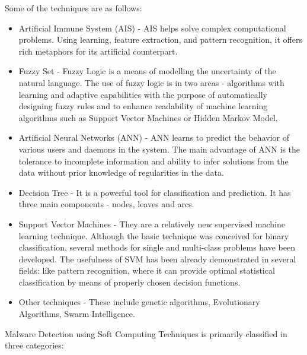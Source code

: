 \documentclass[11pt]{article}
\begin{document}
	Some of the techniques are as follows:
	\begin{itemize}
		\item Artificial Immune System (AIS) - AIS helps solve complex computational problems. Using learning, feature extraction, and pattern recognition, it offers rich metaphors for its artificial counterpart.
		\item Fuzzy Set - Fuzzy Logic is a means of modelling the uncertainty of the natural language. The use of fuzzy logic is in two areas - algorithms with learning and adaptive capabilities with the purpose of automatically designing fuzzy rules and to enhance readability of machine learning algorithms such as Support Vector Machines or Hidden Markov Model.
		\item Artificial Neural Networks (ANN) - ANN learns to predict the behavior of various users and daemons in the system. The main advantage of ANN is the tolerance to incomplete information and ability to infer solutions from the data without prior knowledge of regularities in the data.
		\item Decision Tree - It is a powerful tool for classification and prediction. It has three main components - nodes, leaves and arcs.
		\item Support Vector Machines - They are a relatively new supervised machine learning technique. Although the basic technique was conceived for binary classification, several methods for single and multi-class problems have been developed. The usefulness of SVM has been already demonstrated in several fields: like pattern recognition, where it can provide optimal statistical classification by means of properly chosen decision functions.
		\item Other techniques - These include genetic algorithms, Evolutionary Algorithms, Swarm Intelligence.
	\end{itemize}
	Malware Detection using Soft Computing Techniques is primarily classified in three categories:
\end{document}
